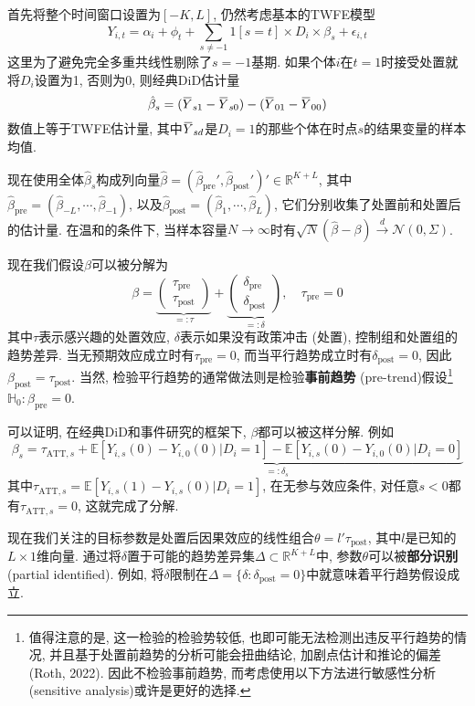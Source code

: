 \documentclass[cn,sakura,14pt,screen,bibstyle=gb7714-2015,math=mtpro2]{elegantnote}
\newcommand{\E}{\mathbb{E}}
\newcommand{\overbar}[1]{\mkern 1.5mu\overline{\mkern-1.5mu#1\mkern-1.5mu}\mkern 1.5mu}
\begin{document}
首先将整个时间窗口设置为$[-K,L]$, 仍然考虑基本的TWFE模型
$$Y_{i,t}=\alpha_i+\phi_t+\sum_{s\ne-1}1[s=t]\times D_i\times\beta_s+\epsilon_{i,t}$$
这里为了避免完全多重共线性剔除了$s=-1$基期. 如果个体$i$在$t=1$时接受处置就将$D_i$设置为1, 否则为0, 则经典DiD估计量
$$\hat{\beta}_s=(\overbar{Y}_{s1}-\overbar{Y}_{s0})-(\overbar{Y}_{01}-\overbar{Y}_{00})$$
数值上等于TWFE估计量, 其中$\overbar{Y}_{sd}$是$D_i=1$的那些个体在时点$s$的结果变量的样本均值.

现在使用全体$\hat{\beta}_s$构成列向量$\hat{\beta}=(\hat{\beta}_{\text{pre}}',\hat{\beta}_{\text{post}}')'\in\mathbb{R}^{K+L}$, 其中$\hat{\beta}_\text{pre}=(\hat{\beta}_{-L},\cdots,\hat{\beta}_{-1})$, 以及$\hat{\beta}_{\text{post}}=(\hat{\beta}_1,\cdots,\hat{\beta}_L)$, 它们分别收集了处置前和处置后的估计量. 在温和的条件下, 当样本容量$N\to\infty$时有$\sqrt{N}(\hat{\beta}-\beta)\xrightarrow{d}\mathcal{N}(0,\Sigma)$.

现在我们假设$\beta$可以被分解为
$$\beta=\underbrace{\begin{pmatrix}
          \tau_\text{pre} \\
          \tau_\text{post}
        \end{pmatrix}}_{=:\tau}+\underbrace{\begin{pmatrix}
          \delta_\text{pre} \\
          \delta_\text{post}
        \end{pmatrix}}_{=:\delta},\quad \tau_\text{pre}=0$$
其中$\tau$表示感兴趣的处置效应, $\delta$表示如果没有政策冲击 (处置), 控制组和处置组的趋势差异. 当无预期效应成立时有$\tau_\text{pre}=0$, 而当平行趋势成立时有$\delta_\text{post}=0$, 因此$\beta_\text{post}=\tau_\text{post}$. 当然, 检验平行趋势的通常做法则是检验\textbf{事前趋势} (pre-trend)假设\footnote{值得注意的是, 这一检验的检验势较低, 也即可能无法检测出违反平行趋势的情况, 并且基于处置前趋势的分析可能会扭曲结论, 加剧点估计和推论的偏差 (Roth, 2022). 因此不检验事前趋势, 而考虑使用以下方法进行敏感性分析 (sensitive analysis)或许是更好的选择.}$\mathbb{H} _0:\beta_\text{pre}=0$.

可以证明, 在经典DiD和事件研究的框架下, $\beta$都可以被这样分解. 例如
$$\beta_s=\tau_{\text{ATT},s}+\underbrace{\E[Y_{i,s}(0)-Y_{i,0}(0)|D_i=1]-\E[Y_{i,s}(0)-Y_{i,0}(0)|D_i=0]}_{=:\delta_s}$$
其中$\tau_{\text{ATT},s}=\E[Y_{i,s}(1)-Y_{i,s}(0)|D_i=1]$, 在无参与效应条件, 对任意$s<0$都有$\tau_{\text{ATT},s}=0$, 这就完成了分解.

现在我们关注的目标参数是处置后因果效应的线性组合$\theta=l'\tau_\text{post}$, 其中$l$是已知的$L\times1$维向量. 通过将$\delta$置于可能的趋势差异集$\Delta\subset\mathbb{R}^{K+L}$中, 参数$\theta$可以被\textbf{部分识别} (partial identified). 例如, 将$\delta$限制在$\Delta=\{\delta:\delta_\text{post}=0\}$中就意味着平行趋势假设成立.
\end{document}

